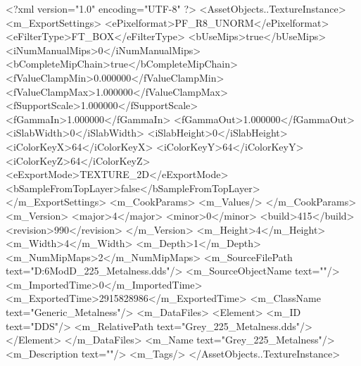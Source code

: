 <?xml version="1.0" encoding="UTF-8" ?>
<AssetObjects..TextureInstance>
	<m_ExportSettings>
		<ePixelformat>PF_R8_UNORM</ePixelformat>
		<eFilterType>FT_BOX</eFilterType>
		<bUseMips>true</bUseMips>
		<iNumManualMips>0</iNumManualMips>
		<bCompleteMipChain>true</bCompleteMipChain>
		<fValueClampMin>0.000000</fValueClampMin>
		<fValueClampMax>1.000000</fValueClampMax>
		<fSupportScale>1.000000</fSupportScale>
		<fGammaIn>1.000000</fGammaIn>
		<fGammaOut>1.000000</fGammaOut>
		<iSlabWidth>0</iSlabWidth>
		<iSlabHeight>0</iSlabHeight>
		<iColorKeyX>64</iColorKeyX>
		<iColorKeyY>64</iColorKeyY>
		<iColorKeyZ>64</iColorKeyZ>
		<eExportMode>TEXTURE_2D</eExportMode>
		<bSampleFromTopLayer>false</bSampleFromTopLayer>
	</m_ExportSettings>
	<m_CookParams>
		<m_Values/>
	</m_CookParams>
	<m_Version>
		<major>4</major>
		<minor>0</minor>
		<build>415</build>
		<revision>990</revision>
	</m_Version>
	<m_Height>4</m_Height>
	<m_Width>4</m_Width>
	<m_Depth>1</m_Depth>
	<m_NumMipMaps>2</m_NumMipMaps>
	<m_SourceFilePath text="D:\Civ6Mod\3D\Hakkapeliitta\Grey_225_Metalness.dds"/>
	<m_SourceObjectName text=""/>
	<m_ImportedTime>0</m_ImportedTime>
	<m_ExportedTime>2915828986</m_ExportedTime>
	<m_ClassName text="Generic_Metalness"/>
	<m_DataFiles>
		<Element>
			<m_ID text="DDS"/>
			<m_RelativePath text="Grey_225_Metalness.dds"/>
		</Element>
	</m_DataFiles>
	<m_Name text="Grey_225_Metalness"/>
	<m_Description text=""/>
	<m_Tags/>
</AssetObjects..TextureInstance>

